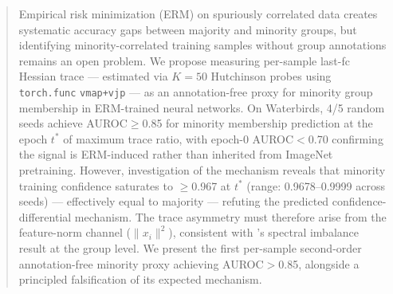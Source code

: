 \begin{abstract}
Empirical risk minimization (ERM) on spuriously correlated data creates systematic accuracy gaps between majority and minority groups, but identifying minority-correlated training samples without group annotations remains an open problem. We propose measuring per-sample last-fc Hessian trace --- estimated via $K{=}50$ Hutchinson probes using \texttt{torch.func} \texttt{vmap+vjp} --- as an annotation-free proxy for minority group membership in ERM-trained neural networks. On Waterbirds, 4/5 random seeds achieve AUROC$\geq$0.85 for minority membership prediction at the epoch $t^*$ of maximum trace ratio, with epoch-0 AUROC$<$0.70 confirming the signal is ERM-induced rather than inherited from ImageNet pretraining. However, investigation of the mechanism reveals that minority training confidence saturates to $\geq$0.967 at $t^*$ (range: 0.9678--0.9999 across seeds) --- effectively equal to majority --- refuting the predicted confidence-differential mechanism. The trace asymmetry must therefore arise from the feature-norm channel ($\|x_i\|^2$), consistent with \cite{labonte2024spectral}'s spectral imbalance result at the group level. We present the first per-sample second-order annotation-free minority proxy achieving AUROC$>$0.85, alongside a principled falsification of its expected mechanism.
\end{abstract}
